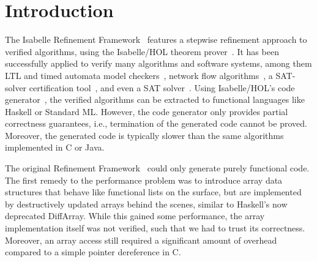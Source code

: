 \documentclass[a4paper,USenglish,cleveref, autoref]{lipics-v2019}
\begin{document}
\section{Introduction}\label{sec:introduction}

% 


The Isabelle Refinement Framework~\cite{LaTu12,La13,La15} features a stepwise refinement approach to verified algorithms, using the Isabelle/HOL theorem prover~\cite{NPW02,NiKl14}.
It has been successfully applied to verify many algorithms and software systems, 
among them LTL and timed automata model checkers~\cite{ELNN13,BrLa18,WiLa18}, network flow algorithms~\cite{LaSe17,LaSe16}, a SAT-solver certification tool~\cite{La17_CADE,La17_SAT}, and even a SAT solver~\cite{FBL18}.
Using Isabelle/HOL's code generator~\cite{HKKN13}, the verified algorithms can be extracted to functional languages like Haskell or Standard ML.
However, the code generator only provides partial correctness guarantees, i.e., termination of the generated code cannot be proved.
Moreover, the generated code is typically slower than the same algorithms implemented in C or Java. 

The original Refinement Framework~\cite{LaTu12,La13} could only generate purely functional code. 
The first remedy to the performance problem was to introduce array data structures that behave like functional 
lists on the surface, but are implemented by destructively updated arrays behind the scenes, similar to Haskell's now deprecated DiffArray.
While this gained some performance, the array implementation itself was not verified, such that we had to trust its correctness. 
Moreover, an array access still required a significant amount of overhead compared to a simple pointer dereference in C.
\end{document}
